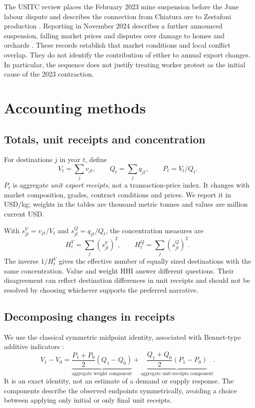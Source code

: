 \documentclass[11pt,a4paper]{article}
\begin{document}
The USITC review places the February 2023 mine suspension before the June labour dispute and describes the connection from Chiatura ore to Zestafoni production \citep{usitc2024}. Reporting in November 2024 describes a further announced suspension, falling market prices and disputes over damage to homes and orchards \citep{civil2024}. These records establish that market conditions and local conflict overlap. They do not identify the contribution of either to annual export changes. In particular, the sequence does not justify treating worker protest as the initial cause of the 2023 contraction.

\section{Accounting methods}
\subsection{Totals, unit receipts and concentration}
For destinations $j$ in year $t$, define
\begin{equation}
 V_t=\sum_j v_{jt},\qquad Q_t=\sum_j q_{jt},\qquad P_t=V_t/Q_t.
\end{equation}
$P_t$ is aggregate \emph{unit export receipts}, not a transaction-price index. It changes with market composition, grades, contract conditions and prices. We report it in USD/kg; weights in the tables are thousand metric tonnes and values are million current USD.

With $s^V_{jt}=v_{jt}/V_t$ and $s^Q_{jt}=q_{jt}/Q_t$, the concentration measures are
\begin{equation}
 H^V_t=\sum_j(s^V_{jt})^2,\qquad H^Q_t=\sum_j(s^Q_{jt})^2.
\end{equation}
The inverse $1/H^V_t$ gives the effective number of equally sized destinations with the same concentration. Value and weight HHI answer different questions. Their disagreement can reflect destination differences in unit receipts and should not be resolved by choosing whichever supports the preferred narrative.

\subsection{Decomposing changes in receipts}
We use the classical symmetric midpoint identity, associated with Bennet-type additive indicators \citep{bennet1920}:
\begin{equation}\label{eq:aggregate}
 V_1-V_0=\underbrace{\frac{P_1+P_0}{2}(Q_1-Q_0)}_{\text{aggregate weight component}}
 +\underbrace{\frac{Q_1+Q_0}{2}(P_1-P_0)}_{\text{aggregate unit-receipts component}}.
\end{equation}
It is an exact identity, not an estimate of a demand or supply response. The components describe the observed endpoints symmetrically, avoiding a choice between applying only initial or only final unit receipts.
\end{document}

